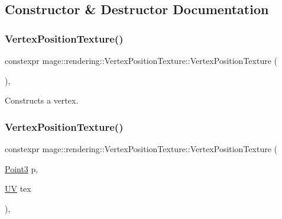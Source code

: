 \subsection{Constructor \& Destructor Documentation}
\hypertarget{structmage_1_1rendering_1_1_vertex_position_texture_ac9f9c56c37af249a5c37145d4fed90fb}{}\label{structmage_1_1rendering_1_1_vertex_position_texture_ac9f9c56c37af249a5c37145d4fed90fb} 
\subsubsection{\texorpdfstring{Vertex\+Position\+Texture()}{VertexPositionTexture()}\hspace{0.1cm}{\footnotesize\ttfamily [1/4]}}
{\footnotesize\ttfamily constexpr mage\+::rendering\+::\+Vertex\+Position\+Texture\+::\+Vertex\+Position\+Texture (\begin{DoxyParamCaption}{ }\end{DoxyParamCaption})\hspace{0.3cm}{\ttfamily [default]}, {\ttfamily [noexcept]}}

Constructs a vertex. \hypertarget{structmage_1_1rendering_1_1_vertex_position_texture_a71b7340eb44f39977a0aa11254ba5970}{}\label{structmage_1_1rendering_1_1_vertex_position_texture_a71b7340eb44f39977a0aa11254ba5970} 
\subsubsection{\texorpdfstring{Vertex\+Position\+Texture()}{VertexPositionTexture()}\hspace{0.1cm}{\footnotesize\ttfamily [2/4]}}
{\footnotesize\ttfamily constexpr mage\+::rendering\+::\+Vertex\+Position\+Texture\+::\+Vertex\+Position\+Texture (\begin{DoxyParamCaption}\item[{\hyperlink{structmage_1_1_point3}{Point3}}]{p,  }\item[{\hyperlink{structmage_1_1_u_v}{UV}}]{tex }\end{DoxyParamCaption})\hspace{0.3cm}{\ttfamily [explicit]}, {\ttfamily [noexcept]}}


